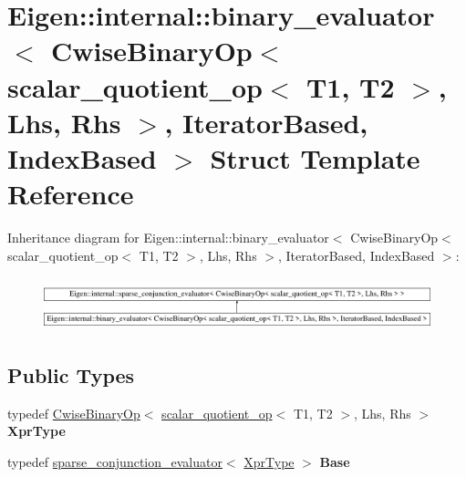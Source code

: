 \hypertarget{struct_eigen_1_1internal_1_1binary__evaluator_3_01_cwise_binary_op_3_01scalar__quotient__op_3_0128fd42b06614e5f165ed5bc517363d65}{}\section{Eigen\+::internal\+::binary\+\_\+evaluator$<$ Cwise\+Binary\+Op$<$ scalar\+\_\+quotient\+\_\+op$<$ T1, T2 $>$, Lhs, Rhs $>$, Iterator\+Based, Index\+Based $>$ Struct Template Reference}
\label{struct_eigen_1_1internal_1_1binary__evaluator_3_01_cwise_binary_op_3_01scalar__quotient__op_3_0128fd42b06614e5f165ed5bc517363d65}
Inheritance diagram for Eigen\+::internal\+::binary\+\_\+evaluator$<$ Cwise\+Binary\+Op$<$ scalar\+\_\+quotient\+\_\+op$<$ T1, T2 $>$, Lhs, Rhs $>$, Iterator\+Based, Index\+Based $>$\+:\begin{figure}[H]
\begin{center}
\leavevmode
\includegraphics[height=1.551247cm]{struct_eigen_1_1internal_1_1binary__evaluator_3_01_cwise_binary_op_3_01scalar__quotient__op_3_0128fd42b06614e5f165ed5bc517363d65}
\end{center}
\end{figure}
\subsection*{Public Types}
\begin{DoxyCompactItemize}
\item 
\mbox{\label{struct_eigen_1_1internal_1_1binary__evaluator_3_01_cwise_binary_op_3_01scalar__quotient__op_3_0128fd42b06614e5f165ed5bc517363d65_a97d2b038b8e5499f0283c1f5071452bb}} 
typedef \mbox{\hyperlink{class_eigen_1_1_cwise_binary_op}{Cwise\+Binary\+Op}}$<$ \mbox{\hyperlink{struct_eigen_1_1internal_1_1scalar__quotient__op}{scalar\+\_\+quotient\+\_\+op}}$<$ T1, T2 $>$, Lhs, Rhs $>$ {\bfseries Xpr\+Type}
\item 
\mbox{\label{struct_eigen_1_1internal_1_1binary__evaluator_3_01_cwise_binary_op_3_01scalar__quotient__op_3_0128fd42b06614e5f165ed5bc517363d65_a3ad71a227e5a9c5959b3f8126a88f01f}} 
typedef \mbox{\hyperlink{struct_eigen_1_1internal_1_1sparse__conjunction__evaluator}{sparse\+\_\+conjunction\+\_\+evaluator}}$<$ \mbox{\hyperlink{class_eigen_1_1_cwise_binary_op}{Xpr\+Type}} $>$ {\bfseries Base}
\end{DoxyCompactItemize}
